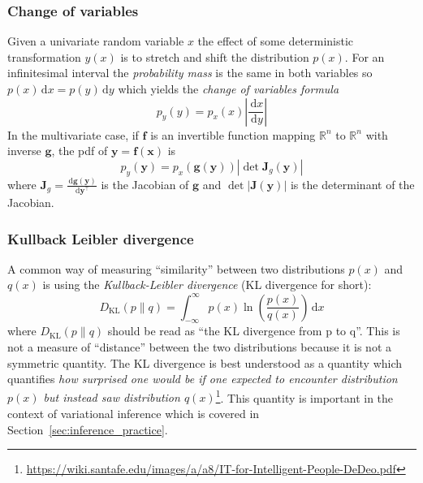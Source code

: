 \documentclass[12pt]{report}
\newcommand{\ud}{\,\mathrm{d}}
\renewcommand{\vec}[1]{\boldsymbol{\mathbf{#1}}}
\begin{document}
\subsubsection{Change of variables}
Given a univariate random variable $x$ the effect of some deterministic
transformation $y(x)$ is to stretch and shift the distribution $p(x)$. For an
infinitesimal interval the \emph{probability mass} is the same in both
variables so $p(x) \ud x=p(y) \ud y$ which yields the \emph{change of variables
    formula}
\begin{equation}
    p_{y}(y)=p_{x}(x)\left|\frac{\ud x}{\ud y}\right|
\end{equation}
In the multivariate case, if $\vec{f}$ is an invertible function mapping $\mathbb{R}^n$
to $\mathbb{R}^n$ with inverse $\vec{g}$, the pdf of $\vec{y}=\vec{f}(\vec{x})$ is
\citep{murphy_book_2022}
\begin{equation}
    p_{y}(\vec{y})=p_{x}(\vec{g}(\vec{y}))\left|\operatorname{det}\mathbf{J}_{g}(\vec{y})\right|
\end{equation}
where $\vec{J}_{g}=\frac{\ud \vec{g}(\vec{y})}{\ud \vec{y}^{\top}}$ is the Jacobian of $\vec{g}$
and $\operatorname{det}|\mathbf{J}(\vec{y})|$ is the determinant of the Jacobian.

\subsubsection{Kullback Leibler divergence}
A common way of measuring ``similarity'' between two distributions $p(x)$ and
$q(x)$ is using the \emph{Kullback-Leibler divergence} (KL divergence for
short):
\begin{equation}
    D_{\mathrm{KL}}(p \| q)=\int_{-\infty}^{\infty} p(x) \ln \left(\frac{p(x)}{q(x)}\right) \ud x
    \label{eq:kl_divergence}
\end{equation}
where $D_{\mathrm{KL}}(p \| q)$ should be read as ``the KL divergence from p to q''.
This is not a measure of ``distance'' between the two distributions because
it is not a symmetric quantity. The KL divergence is best understood as a quantity which
quantifies \emph{how surprised one would be if one expected to encounter distribution $p(x)$
    but instead saw distribution
    $q(x)$}\footnote{\url{https://wiki.santafe.edu/images/a/a8/IT-for-Intelligent-People-DeDeo.pdf}}.
This quantity is important in the context of variational inference which is covered in
Section~\ref{sec:inference_practice}.
\end{document}
